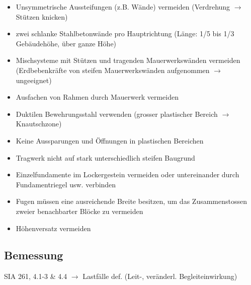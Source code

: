 \begin{multicols}{2}
\begin{itemize}
					\item Unsymmetrische Aussteifungen (z.B. Wände) vermeiden (Verdrehung $\rightarrow$ Stützen knicken)
					
					\item zwei schlanke Stahlbetonwände pro Hauptrichtung (Länge: 1/5 bis 1/3 Gebäudehöhe, über ganze Höhe)
					
					\item Mischsysteme mit Stützen und tragenden Mauerwerkswänden vermeiden (Erdbebenkräfte von steifen Mauerwerkswänden aufgenommen $\rightarrow$ ungeeignet)
					
					\item Ausfachen von Rahmen durch Mauerwerk vermeiden
					
					\item Duktilen Bewehrungsstahl verwenden (grosser plastischer Bereich $\rightarrow$ Knautschzone)

					\item Keine Aussparungen und Öffnungen in
					plastischen Bereichen
					
					\item Tragwerk nicht auf stark unterschiedlich
					steifen Baugrund
					
					\item Einzelfundamente im Lockergestein		vermeiden oder untereinander durch Fundamentriegel usw. verbinden
					
					\item Fugen müssen eine ausreichende Breite besitzen, um das Zusammenstossen zweier benachbarter Blöcke zu vermeiden
					
					\item Höhenversatz vermeiden
					
				\end{itemize}
			
			
				\subsection{Bemessung}
			
			SIA 261, 4.1-3 \& 4.4 $\rightarrow$ Lastfälle def. (Leit-, veränderl. Begleiteinwirkung)
			
			
			
			
		
	\end{multicols}